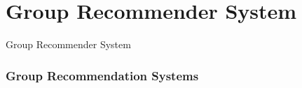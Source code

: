 \section{Group Recommender System}
\begin{frame}
     \begin{center}
     	\huge Group Recommender System 
     \end{center}
\end{frame}
\begin{frame}
\frametitle{Group Recommendation Systems}
\end{frame}
